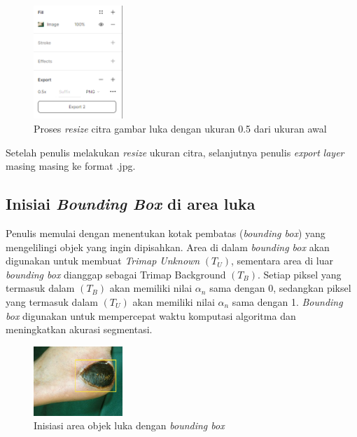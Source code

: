 \begin{figure}[H]
	\centering{}
	\includegraphics[width=0.3\textwidth]{gambar/gambar-3_4.png}
	\caption{Proses \emph{resize} citra gambar luka dengan ukuran 0.5 dari ukuran awal}
  \end{figure}

Setelah penulis melakukan \emph{resize} ukuran citra, selanjutnya penulis \emph{export}
\emph{layer} masing masing ke format .jpg.


\subsection{Inisiai \emph{Bounding Box} di area luka}

Penulis memulai dengan menentukan kotak pembatas (\emph{bounding box}) yang mengelilingi 
objek yang ingin dipisahkan. Area di dalam \emph{bounding box} akan digunakan untuk membuat 
\emph{Trimap Unknown} \((T_{U})\), sementara area di luar \emph{bounding box} dianggap sebagai Trimap 
Background \((T_{B})\). Setiap piksel yang termasuk dalam \((T_{B})\) akan memiliki nilai 
\(\alpha_{n}\) sama dengan 0, sedangkan piksel yang termasuk dalam \((T_{U})\) akan memiliki nilai 
\(\alpha_{n}\) sama dengan 1. \emph{Bounding box} digunakan untuk mempercepat waktu komputasi algoritma dan meningkatkan 
akurasi segmentasi.

\begin{figure}[H]
	\centering{}
    \includegraphics[width=0.3\textwidth]{gambar/rectangle.png}
	\caption{Inisiasi area objek luka dengan \emph{bounding box}}
\end{figure}

